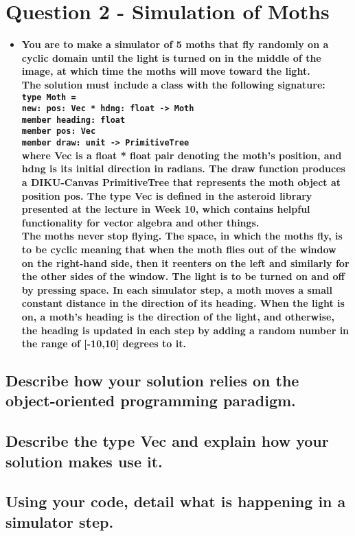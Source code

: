 \documentclass[a4paper,12pt]{article}
\begin{document}
\section{Question 2 - Simulation of Moths}
\begin{itemize}
    \item[] \textbf{You are to make a simulator of 5 moths that fly randomly on a cyclic domain until the light is turned on in the middle of the image, at which time the moths will move toward the light.\\
The solution must include a class with the following signature:\\
\lstinline{type Moth =}\\
\lstinline{new: pos: Vec * hdng: float -> Moth}\\
\lstinline{member heading: float}\\
\lstinline{member pos: Vec}\\
\lstinline{member draw: unit -> PrimitiveTree}\\
where Vec is a float * float pair denoting the moth's position, and hdng is its initial direction in radians. The draw function produces a DIKU-Canvas PrimitiveTree that represents the moth object at position pos. The type Vec is defined in the asteroid library presented at the lecture in Week 10, which contains helpful functionality for vector algebra and other things.\\
The moths never stop flying. The space, in which the moths fly, is to be cyclic meaning that when the moth flies out of the window on the right-hand side, then it reenters on the left and similarly for the other sides of the window. The light is to be turned on and off by pressing space. In each simulator step, a moth moves a small constant distance in the direction of its heading. When the light is on, a moth's heading is the direction of the light, and otherwise, the heading is updated in each step by adding a random number in the range of [-10,10] degrees to it.}
\end{itemize}

\subsection{Describe how your solution relies on the object-oriented programming paradigm.}

\subsection{Describe the type Vec and explain how your solution makes use it.}

\subsection{Using your code, detail what is happening in a simulator step. }
\end{document}
